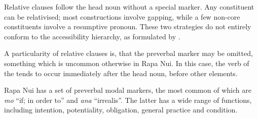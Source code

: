 Relative clauses follow the head noun without a special marker. Any constituent can be relativised; most  constructions involve gapping, while a few non-core constituents involve a resumptive pronoun. These two strategies do not entirely conform to the  accessibility hierarchy, as formulated by \citet{KeenanComrie1977}. 

A particularity of relative clauses is, that the preverbal marker may be omitted, something which is uncommon otherwise in Rapa Nui. In this case, the verb of the  tends to occur immediately after the head noun, before other  elements.

Rapa Nui has a set of preverbal modal markers, the most common of which are \textit{mo} “if; in order to” and \textit{ana} “irrealis”. The latter has a wide range of functions, including intention, potentiality, obligation, general practice and condition.

